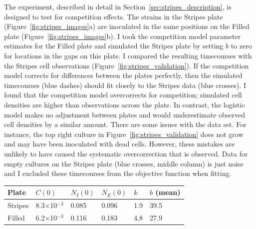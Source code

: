 \begin{multicols}{2}
The experiment, described in detail in
Section~\ref{sec:stripes_description}, is designed to test for
competition effects.
The strains in the Stripes plate (Figure~\ref{fig:stripes_images}a)
are inoculated in the same positions on the Filled plate
(Figure~\ref{fig:stripes_images}b). I took the competition model
parameter estimates for the Filled plate and simulated the Stripes
plate by setting \(b\) to zero for locations in the gaps on this
plate. I compared the resulting timecourses with the Stripes cell
observations (Figure~\ref{fig:stripes_validation}). If the competition
model corrects for differences between the plates perfectly, then the
simulated timecourses (blue dashes) should fit closely to the Stripes
data (blue crosses). I found that the competition model overcorrects
for competition; simulated cell densities are higher than observations
across the plate. In contrast, the logistic model makes no adjustment
between plates and would underestimate observed cell densities by a
similar amount. There are some issues with the data set. For instance,
the top right culture in Figure~\ref{fig:stripes_validation} does not
grow and may have been inoculated with dead cells. However, these
mistakes are unlikely to have caused the systematic overcorrection
that is observed. Data for empty cultures on the Stripes plate (blue
crosses, middle column) is just noise and I excluded these timecourses
from the objective function when fitting.

\begin{center}
  \begin{tabular}{l l l l l l}
    \hline
    Plate     & \(C(0)\)                   & \(N_{I}(0)\) & \(N_{E}(0)\) & \(k\) & \(b\) (mean)\\
    \hline
    Stripes   & 8.3\(\times\)10\(^{-3}\)   & 0.085      & 0.096       & 1.9  & 39.5\\
    Filled    & 6.2\(\times\)10\(^{-3}\)   & 0.116      & 0.183       & 4.8  & 27.9\\
    \hline
  \end{tabular}
  \label{tab:Stripes_and_Filled_params}
\end{center}


\end{multicols}
